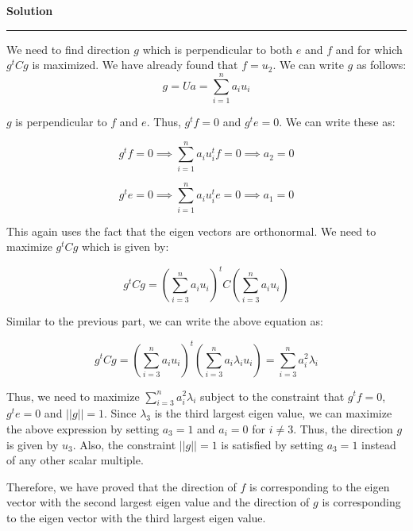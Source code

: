 \documentclass[a4paper,12pt]{article}
\newenvironment{solution}[2][]{%
    \begin{mdframed}[linecolor=blue!70!black, linewidth=2pt, roundcorner=10pt, backgroundcolor=yellow!10!white, skipabove=12pt, skipbelow=12pt]%
        \textbf{\large #2}
        \par\noindent\rule{\textwidth}{0.4pt}
}{
    \end{mdframed}
}
\begin{document}
\clearpage
\begin{solution}{Solution}
  We need to find direction $g$ which is perpendicular to both $e$ and $f$ and for which $g^tCg$ is maximized. We have already found that $f = u_2$. We can write $g$ as follows:
  \begin{equation}
    g = Ua = \sum_{i=1}^{n} a_iu_i
  \end{equation}

$g$ is perpendicular to $f$ and $e$. Thus, $g^tf = 0$ and $g^te = 0$. We can write these as:

\begin{equation}
  g^tf = 0 \implies \sum_{i=1}^{n} a_iu_i^tf = 0 \implies a_2 = 0
\end{equation}

\begin{equation}
  g^te = 0 \implies \sum_{i=1}^{n} a_iu_i^te = 0 \implies a_1 = 0
\end{equation}

This again uses the fact that the eigen vectors are orthonormal. We need to maximize $g^tCg$ which is given by:

\begin{equation}
  g^tCg = (\sum_{i=3}^n a_iu_i)^t C(\sum_{i=3}^n a_iu_i)
\end{equation}

Similar to the previous part, we can write the above equation as:

\begin{equation}
  g^tCg = (\sum_{i=3}^n a_iu_i)^t (\sum_{i=3}^n a_i\lambda_iu_i) = \sum_{i=3}^n a_i^2\lambda_i
\end{equation}

Thus, we need to maximize $\sum_{i=3}^n a_i^2\lambda_i$ subject to the constraint that $g^tf = 0$, $g^te = 0$ and $||g|| = 1$. Since $\lambda_3$ is the third largest eigen value, we can maximize the above expression by setting $a_3 = 1$ and $a_i = 0$ for $i \neq 3$. Thus, the direction $g$ is given by $u_3$. Also, the constraint $||g|| = 1$ is satisfied by setting $a_3 = 1$ instead of any other scalar multiple.


Therefore, we have proved that the direction of $f$ is corresponding to the eigen vector with the second largest eigen value and the direction of $g$ is corresponding to the eigen vector with the third largest eigen value.
\end{solution}

\end{document}
